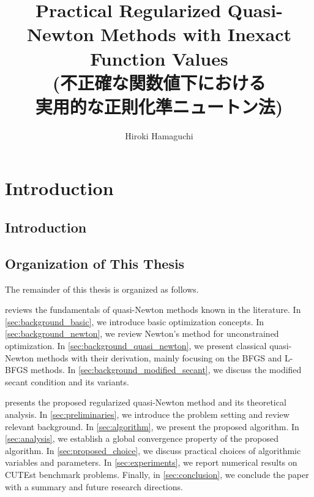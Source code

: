 \documentclass[uplatex,english,suri,master]{suribt}
\title{Practical Regularized Quasi-Newton Methods with Inexact Function Values\\
(不正確な関数値下における\\実用的な正則化準ニュートン法)}
\author{Hiroki Hamaguchi}
\begin{document}
\maketitle%

\frontmatter%
\begin{abstract}%
    
\end{abstract}

\tableofcontents%

\mainmatter%

\chapter{Introduction}

\section{Introduction}\label{sec:introduction}



\section{Organization of This Thesis}

The remainder of this thesis is organized as follows.

 reviews the fundamentals of quasi-Newton methods known in the literature.
In \cref{sec:background_basic}, we introduce basic optimization concepts.
In \cref{sec:background_newton}, we review Newton's method for unconstrained optimization.
In \cref{sec:background_quasi_newton}, we present classical quasi-Newton methods with their derivation, mainly focusing on the BFGS and L-BFGS methods.
In \cref{sec:background_modified_secant}, we discuss the modified secant condition and its variants.

 presents the proposed regularized quasi-Newton method and its theoretical analysis.
In \cref{sec:preliminaries}, we introduce the problem setting and review relevant background.
In \cref{sec:algorithm}, we present the proposed algorithm.
In \cref{sec:analysis}, we establish a global convergence property of the proposed algorithm.
In \cref{sec:proposed_choice}, we discuss practical choices of algorithmic variables and parameters.
In \cref{sec:experiments}, we report numerical results on CUTEst benchmark problems.
Finally, in \cref{sec:conclusion}, we conclude the paper with a summary and future research directions.
\end{document}
